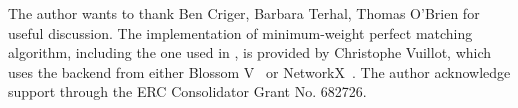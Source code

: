 The author wants to thank Ben Criger, Barbara Terhal, Thomas O'Brien for useful discussion.
The implementation of minimum-weight perfect matching algorithm, including the one used in , is provided by Christophe Vuillot, which uses the backend from either Blossom V~\cite{Kolmogorov2009BlossomV} or NetworkX~\cite{networkx}.
The author acknowledge support through the ERC Consolidator Grant No. 682726.